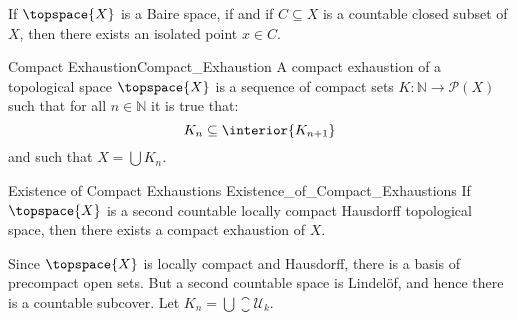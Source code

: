     \begin{theorem}
        If $\topspace{X}$ is a Baire space, if and if $C\subseteq{X}$ is a
        countable closed subset of $X$, then there exists an isolated point
        $x\in{C}$.
    \end{theorem}
    \begin{fdefinition}{Compact Exhaustion}{Compact_Exhaustion}
        A compact exhaustion of a topological space $\topspace{X}$ is a
        sequence of compact sets $K:\mathbb{N}\rightarrow\mathcal{P}(X)$
        such that for all $n\in\mathbb{N}$ it is true that:
        \begin{equation*}
            K_{n}\subseteq\interior{{K}_{n+1}}
        \end{equation*}
        and such that $X=\bigcup{K}_{n}$.
    \end{fdefinition}
    \begin{ftheorem}{Existence of Compact Exhaustions}
                    {Existence_of_Compact_Exhaustions}
        If $\topspace{X}$ is a second countable locally compact Hausdorff
        topological space, then there exists a compact exhaustion of $X$.
    \end{ftheorem}
    \begin{bproof}
        Since $\topspace{X}$ is locally compact and Hausdorff, there is a
        basis of precompact open sets. But a second countable space is
        Lindel\"{o}f, and hence there is a countable subcover. Let
        $K_{n}=\bigcup\closure{\mathcal{U}_{k}}$.
    \end{bproof}
